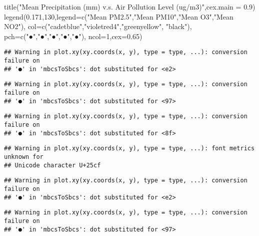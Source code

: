 \documentclass[
]{article}
\newenvironment{Shaded}{\begin{snugshade}}{\end{snugshade}}
\newcommand{\AttributeTok}[1]{\textcolor[rgb]{0.77,0.63,0.00}{#1}}
\newcommand{\DecValTok}[1]{\textcolor[rgb]{0.00,0.00,0.81}{#1}}
\newcommand{\FloatTok}[1]{\textcolor[rgb]{0.00,0.00,0.81}{#1}}
\newcommand{\FunctionTok}[1]{\textcolor[rgb]{0.00,0.00,0.00}{#1}}
\newcommand{\NormalTok}[1]{#1}
\newcommand{\StringTok}[1]{\textcolor[rgb]{0.31,0.60,0.02}{#1}}
\begin{document}
\begin{Shaded}
\begin{Highlighting}[]
\FunctionTok{title}\NormalTok{(}\StringTok{"Mean Precipitation (mm) v.s. Air Pollution Level (ug/m3)"}\NormalTok{,}\AttributeTok{cex.main =} \FloatTok{0.9}\NormalTok{)}
\FunctionTok{legend}\NormalTok{(}\FloatTok{0.171}\NormalTok{,}\DecValTok{130}\NormalTok{,}\AttributeTok{legend=}\FunctionTok{c}\NormalTok{(}\StringTok{"Mean PM2.5"}\NormalTok{,}\StringTok{"Mean PM10"}\NormalTok{,}\StringTok{"Mean O3"}\NormalTok{,}\StringTok{"Mean NO2"}\NormalTok{), }\AttributeTok{col=}\FunctionTok{c}\NormalTok{(}\StringTok{"cadetblue"}\NormalTok{,}\StringTok{"violetred4"}\NormalTok{,}\StringTok{"greenyellow"}\NormalTok{, }\StringTok{"black"}\NormalTok{), }\AttributeTok{pch=}\FunctionTok{c}\NormalTok{(}\StringTok{"●"}\NormalTok{,}\StringTok{"●"}\NormalTok{,}\StringTok{"●"}\NormalTok{,}\StringTok{"●"}\NormalTok{,}\StringTok{"●"}\NormalTok{), }\AttributeTok{ncol=}\DecValTok{1}\NormalTok{,}\AttributeTok{cex=}\FloatTok{0.65}\NormalTok{)}
\end{Highlighting}
\end{Shaded}

\begin{verbatim}
## Warning in plot.xy(xy.coords(x, y), type = type, ...): conversion failure on
## '●' in 'mbcsToSbcs': dot substituted for <e2>
\end{verbatim}

\begin{verbatim}
## Warning in plot.xy(xy.coords(x, y), type = type, ...): conversion failure on
## '●' in 'mbcsToSbcs': dot substituted for <97>
\end{verbatim}

\begin{verbatim}
## Warning in plot.xy(xy.coords(x, y), type = type, ...): conversion failure on
## '●' in 'mbcsToSbcs': dot substituted for <8f>
\end{verbatim}

\begin{verbatim}
## Warning in plot.xy(xy.coords(x, y), type = type, ...): font metrics unknown for
## Unicode character U+25cf
\end{verbatim}

\begin{verbatim}
## Warning in plot.xy(xy.coords(x, y), type = type, ...): conversion failure on
## '●' in 'mbcsToSbcs': dot substituted for <e2>
\end{verbatim}

\begin{verbatim}
## Warning in plot.xy(xy.coords(x, y), type = type, ...): conversion failure on
## '●' in 'mbcsToSbcs': dot substituted for <97>
\end{verbatim}
\end{document}
